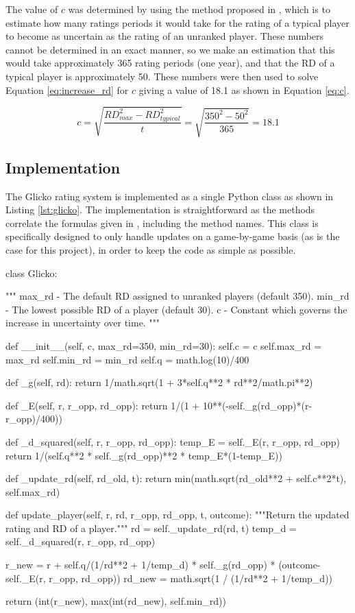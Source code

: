 The value of $c$ was determined by using the method proposed in \cite{glicko}, which is to estimate how many ratings periods it would take for the rating of a typical player to become as uncertain as the rating of an unranked player.
These numbers cannot be determined in an exact manner, so we make an estimation that this would take approximately 365 rating periods (one year), and that the RD of a typical player is approximately 50.
These numbers were then used to solve Equation \ref{eq:increase_rd} for $c$ giving a value of 18.1 as shown in Equation \ref{eq:c}.

\begin{equation} \label{eq:c}
c = \sqrt{\frac{RD^2_{max} - RD^2_{typical}}{t}} = \sqrt{\frac{350^2 - 50^2}{365}} = 18.1
\end{equation}

\subsection{Implementation}
\label{sec:glicko_implementation}
The Glicko rating system is implemented as a single Python class as shown in Listing \ref{lst:glicko}.
The implementation is straightforward as the methods correlate the formulas given in \cite{glicko}, including the method names.
This class is specifically designed to only handle updates on a game-by-game basis (as is the case for this project), in order to keep the code as simple as possible.

\begin{code}[language={Python}, style={PythonDoc}, caption={The \texttt{Glicko} Class}, label={lst:glicko}]
class Glicko:

	"""
	max_rd - The default RD assigned to unranked players (default 350).
	min_rd - The lowest possible RD of a player (default 30).
	c - Constant which governs the increase in uncertainty over time.
	"""

	def __init__(self, c, max_rd=350, min_rd=30):
		self.c = c
		self.max_rd = max_rd
		self.min_rd = min_rd
		self.q = math.log(10)/400

	def _g(self, rd):
		return 1/math.sqrt(1 + 3*self.q**2 * rd**2/math.pi**2)

	def _E(self, r, r_opp, rd_opp):
		return 1/(1 + 10**(-self._g(rd_opp)*(r-r_opp)/400))

	def _d_squared(self, r, r_opp, rd_opp):
		temp_E = self._E(r, r_opp, rd_opp)
		return 1/(self.q**2 * self._g(rd_opp)**2 * temp_E*(1-temp_E))

	def _update_rd(self, rd_old, t):
		return min(math.sqrt(rd_old**2 + self.c**2*t), self.max_rd)

	def update_player(self, r, rd, r_opp, rd_opp, t, outcome):
		"""Return the updated rating and RD of a player."""
		rd = self._update_rd(rd, t)
		temp_d = self._d_squared(r, r_opp, rd_opp)

		r_new = r + self.q/(1/rd**2 + 1/temp_d) * self._g(rd_opp) *
			(outcome-self._E(r, r_opp, rd_opp))
		rd_new = math.sqrt(1 / (1/rd**2 + 1/temp_d))

		return (int(r_new), max(int(rd_new), self.min_rd))
\end{code}

